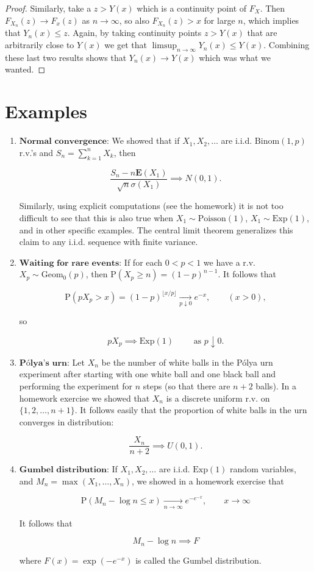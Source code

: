 \documentclass[11pt]{report}
\theoremstyle{plain}
\theoremstyle{definition}
\begin{document}
\begin{proof}
Similarly, take a $z>Y(x)$ which is a continuity
point of $F_X$. Then $F_{X_n}(z)\to F_x(z)$ as
$n\to\infty$, so also $F_{X_n}(z)>x$ for large $n$,
which implies that $Y_n(x)\le z$. Again, by taking
continuity points $z>Y(x)$ that are arbitrarily close
to $Y(x)$ we get that
$\limsup_{n\to\infty} Y_n(x) \le Y(x)$. Combining
these last two results shows that $Y_n(x)\to Y(x)$
which was what we wanted.
\end{proof}

\section{Examples}

\begin{enumerate}[label=\arabic*.]
\item $\textbf{Normal convergence:}$ We showed that if
$X_1,X_2,\ldots$ are i.i.d. $\textrm{Binom}(1,p)$
r.v.'s and $S_n=\sum_{k=1}^n X_k$, then

\[
\frac{S_n-n \mathbf{E}(X_1)}{\sqrt{n} \sigma(X_1)} \implies N(0,1).
\]

\noindent Similarly, using explicit computations (see the
homework) it is not too difficult to see that this is
also true when $X_1\sim \textrm{Poisson}(1)$,
$X_1 \sim \textrm{Exp}(1)$, and in other specific
examples. The central limit theorem generalizes this
claim to any i.i.d. sequence with finite variance.

\item $\textbf{Waiting for rare events:}$ If for each
$0<p<1$ we have a r.v. $X_p \sim \textrm{Geom}_0(p)$,
then $\mathrm{P}(X_p \ge n) = (1-p)^{n-1}$. It
follows that

\[
\mathrm{P}(p X_p > x) = (1-p)^{\lfloor x/p \rfloor} \xrightarrow[p\downarrow 0]{} e^{-x}, \qquad (x > 0),
\]

\noindent so

\[
p X_p \implies \textrm{Exp}(1)\qquad \textrm{ as }p\downarrow 0.
\]

\item $\textbf{Pólya's urn:}$ Let $X_n$ be the number of
white balls in the Pólya urn experiment after starting
with one white ball and one black ball and performing
the experiment for $n$ steps (so that there are $n+2$
balls). In a homework exercise we showed that $X_n$
is a discrete uniform r.v. on $\{1,2,\ldots,n+1\}$.
It follows easily that the proportion of white balls
in the urn converges in distribution:

\[
\frac{X_n}{n+2} \implies U(0,1).
\]

\item $\textbf{Gumbel distribution:}$ If $X_1,X_2,\ldots$
are i.i.d. $\textrm{Exp}(1)$ random variables, and
$M_n=\max(X_1,\ldots,X_n)$, we showed in a homework
exercise that

\[
\mathrm{P}(M_n-\log n \le x) \xrightarrow[n\to\infty]{} e^{-e^{-x}}, \qquad x\to\infty
\]

\noindent It follows that

\[
M_n-\log n \implies F
\]

\noindent where $F(x) = \exp\left(-e^{-x}\right)$ is called the
Gumbel distribution.
\end{enumerate}
\end{document}
